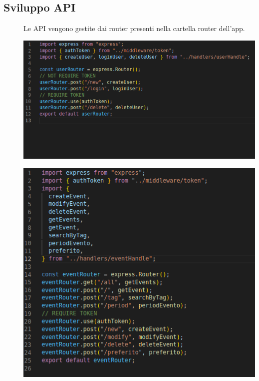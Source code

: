 \documentclass{article}
\begin{document}
\subsection{Sviluppo API}
\begin{description}
    \item[] Le API vengono gestite dai router presenti nella cartella router dell'app.
    \item[] \begin{center}
            \includegraphics[scale=0.5]{userRouter.png}
        \end{center}
    \item[] \begin{center}
            \includegraphics[scale=0.5]{eventRouter.png}
        \end{center}
\end{description}
\clearpage
\end{document}

